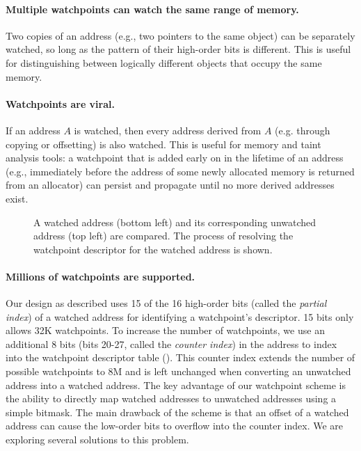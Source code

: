 \paragraph{Multiple watchpoints can watch the same range of memory.} Two copies of an address (e.g., two pointers to the same object) can be separately watched, so long as the pattern of their high-order bits is different. This is useful for distinguishing between logically different objects that occupy the same memory. %
	
\paragraph{Watchpoints are viral.} If an address $A$ is watched, then every address derived from $A$ (e.g. through copying or offsetting) is also watched. This is useful for memory and taint analysis tools: a watchpoint that is added early on in the lifetime of an address (e.g., immediately before the address of some newly allocated memory is returned from an allocator) can persist and propagate until no more derived addresses exist.

\begin{figure}[t]
\begin{center}
\end{center}
\caption{\label{fig:watchpoint_descriptor_table}A watched address (bottom left) and its corresponding unwatched address (top left) are compared. The process of resolving the watchpoint descriptor for the watched address is shown.}
\end{figure}

\paragraph{Millions of watchpoints are supported.} Our design as described uses 15 of the 16 high-order bits (called the \emph{partial index}) of a watched address for identifying a watchpoint's descriptor. 15 bits only allows 32K watchpoints. To increase the number of watchpoints, we use an additional 8 bits (bits 20-27, called the \emph{counter index}) in the address to index into the watchpoint descriptor table (). This counter index extends the number of possible watchpoints to 8M and is left unchanged when converting an unwatched address into a watched address. The key advantage of our watchpoint scheme is the ability to directly map watched addresses to unwatched addresses using a simple bitmask. The main drawback of the scheme is that an offset of a watched address can cause the low-order bits to overflow into the counter index. We are exploring several solutions to this problem.

